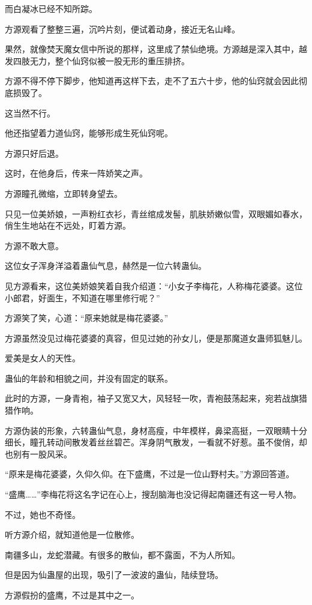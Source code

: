 \begin{this_body}
而白凝冰已经不知所踪。

方源观看了整整三遍，沉吟片刻，便试着动身，接近无名山峰。

果然，就像焚天魔女信中所说的那样，这里成了禁仙绝境。方源越是深入其中，越发四肢无力，整个仙窍似被一股无形的重压排挤。

方源不得不停下脚步，他知道再这样下去，走不了五六十步，他的仙窍就会因此彻底损毁了。

这当然不行。

他还指望着力道仙窍，能够形成生死仙窍呢。

方源只好后退。

这时，在他身后，传来一阵娇笑之声。

方源瞳孔微缩，立即转身望去。

只见一位美娇娘，一声粉红衣衫，青丝绾成发髻，肌肤娇嫩似雪，双眼媚如春水，俏生生地站在不远处，盯着方源。

方源不敢大意。

这位女子浑身洋溢着蛊仙气息，赫然是一位六转蛊仙。

见方源看来，这位美娇娘笑着自我介绍道：“小女子李梅花，人称梅花婆婆。这位小郎君，好面生，不知道在哪里修行呢？”

方源笑了笑，心道：“原来她就是梅花婆婆。”

方源虽然没见过梅花婆婆的真容，但见过她的孙女儿，便是那魔道女蛊师狐魅儿。

爱美是女人的天性。

蛊仙的年龄和相貌之间，并没有固定的联系。

此时的方源，一身青袍，袖子又宽又大，风轻轻一吹，青袍鼓荡起来，宛若战旗猎猎作响。

方源伪装的形象，六转蛊仙气息，身材高瘦，中年模样，鼻梁高挺，一双眼睛十分细长，瞳孔转动间散发着丝丝碧芒。浑身阴气散发，一看就不好惹。虽不俊俏，却也别有一股风采。

“原来是梅花婆婆，久仰久仰。在下盛鹰，不过是一位山野村夫。”方源回答道。

“盛鹰……”李梅花将这名字记在心上，搜刮脑海也没记得起南疆还有这一号人物。

不过，她也不奇怪。

听方源介绍，就知道他是一位散修。

南疆多山，龙蛇潜藏。有很多的散仙，都不露面，不为人所知。

但是因为仙蛊屋的出现，吸引了一波波的蛊仙，陆续登场。

方源假扮的盛鹰，不过是其中之一。


\end{this_body}
